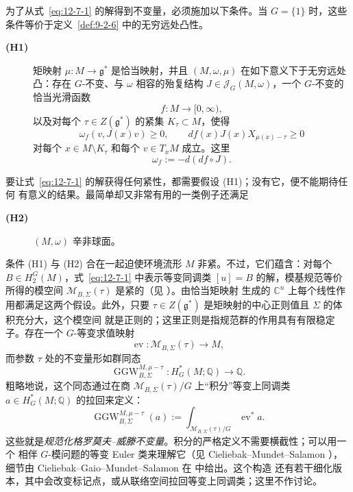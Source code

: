 为了从式~\eqref{eq:12-7-1} 的解得到不变量，必须施加以下条件。当 $G=\{1\}$ 时，这些
条件等价于定义~\ref{def:9-2-6} 中的无穷远处凸性。

\begin{description}
\item[\normalfont\textbf{(H1)}]
矩映射
$\mu:M\to\mathfrak g^*$
是恰当映射，并且 $(M,\omega,\mu)$ 在如下意义下于无穷远处凸：存在
$G$-不变、与 $\omega$ 相容的殆复结构 $J\in\mathcal J_G(M,\omega)$，一个 $G$-不变的
恰当光滑函数
\[
  f:M\longrightarrow[0,\infty),
\]
以及对每个 $\tau\in Z(\mathfrak g^*)$ 的紧集 $K_\tau\subset M$，使得
\[
  \omega_f(v,J(x)v)\geq0,
  \qquad
  df(x)J(x)X_{\mu(x)-\tau}\geq0
\]
对每个 $x\in M\setminus K_\tau$ 和每个 $v\in T_xM$ 成立。这里
\[
  \omega_f:=-d(df\circ J).
\]
\end{description}

要让式~\eqref{eq:12-7-1} 的解获得任何紧性，都需要假设 (H1)；没有它，便不能期待任何
有意义的结果。最简单却又非常有用的一类例子还满足

\begin{description}
\item[\normalfont\textbf{(H2)}]
$(M,\omega)$ 辛非球面。
\end{description}

条件 (H1) 与 (H2) 合在一起迫使环境流形 $M$ 非紧。不过，它们蕴含：对每个
$B\in H_2^G(M)$，式~\eqref{eq:12-7-1} 中表示等变同调类 $[u]=B$ 的解，模基规范等价
所得的模空间 $\mathcal M_{B,\Sigma}(\tau)$ 是紧的（见 ）。由恰当矩映射
生成的 $\mathbb C^n$ 上每个线性作用都满足这两个假设。此外，只要
$\tau\in Z(\mathfrak g^*)$ 是矩映射的中心正则值且 $\Sigma$ 的体积充分大，这个模空间
就是正则的；这里正则是指规范群的作用具有有限稳定子。存在一个 $G$-等变求值映射
\[
  \operatorname{ev}:\mathcal M_{B,\Sigma}(\tau)\longrightarrow M,
\]
而参数 $\tau$ 处的不变量形如群同态
\[
  \operatorname{GGW}^{M,\mu-\tau}_{B,\Sigma}:
  H_G^*(M;\mathbb Q)\longrightarrow\mathbb Q.
\]
粗略地说，这个同态通过在商 $\mathcal M_{B,\Sigma}(\tau)/G$ 上“积分”等变上同调类
$a\in H_G^*(M;\mathbb Q)$ 的拉回来定义：
\begin{equation}\label{eq:12-7-3}
  \operatorname{GGW}^{M,\mu-\tau}_{B,\Sigma}(a)
  :=\int_{\mathcal M_{B,\Sigma}(\tau)/G}\operatorname{ev}^*a.
\end{equation}
这些就是\emph{规范化格罗莫夫--威滕不变量}。积分的严格定义不需要横截性；可以用一个
相伴 $G$-模问题的等变 Euler 类来理解它（见 Cieliebak--Mundet--Salamon
），细节由 Cieliebak--Gaio--Mundet--Salamon 在  中给出。这个构造
还有若干细化版本，其中会改变标记点，或从联络空间拉回等变上同调类；这里不作讨论。

